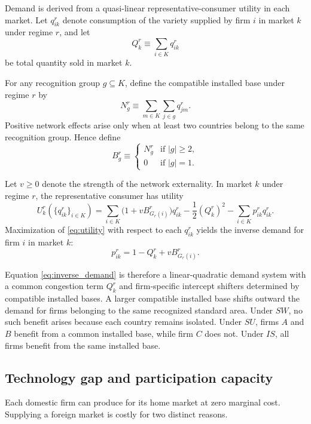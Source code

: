 Demand is derived from a quasi-linear representative-consumer utility in each market. Let $q_{ik}^r$ denote consumption of the variety supplied by firm $i$ in market $k$ under regime $r$, and let
\[
Q_k^r \equiv \sum_{i \in K} q_{ik}^r
\]
be total quantity sold in market $k$.

For any recognition group $g \subseteq K$, define the compatible installed base under regime $r$ by
\[
N_g^r \equiv \sum_{m \in K} \sum_{j \in g} q_{jm}^r.
\]
Positive network effects arise only when at least two countries belong to the same recognition group. Hence define
\[
B_g^r \equiv 
\begin{cases}
N_g^r & \text{if } |g| \ge 2,\\
0   & \text{if } |g| = 1.
\end{cases}
\]

Let $v \ge 0$ denote the strength of the network externality. In market $k$ under regime $r$, the representative consumer has utility
\begin{equation}
U_k^r(\{q_{ik}^r\}_{i \in K})
=
\sum_{i \in K} \bigl(1 + v B_{G_r(i)}^r\bigr) q_{ik}^r
-
\frac{1}{2}(Q_k^r)^2
-
\sum_{i \in K} p_{ik}^r q_{ik}^r.
\label{eq:utility}
\end{equation}
Maximization of \eqref{eq:utility} with respect to each $q_{ik}^r$ yields the inverse demand for firm $i$ in market $k$:
\begin{equation}
p_{ik}^r = 1 - Q_k^r + v B_{G_r(i)}^r.
\label{eq:inverse_demand}
\end{equation}

Equation \eqref{eq:inverse_demand} is therefore a linear-quadratic demand
system with a common congestion term $Q_k^r$ and firm-specific intercept
shifters determined by compatible installed bases. A larger compatible
installed base shifts outward the demand for firms belonging to the same
recognized standard area. Under $SW$, no such benefit arises because each
country remains isolated. Under $SU$, firms $A$ and $B$ benefit from a common
installed base, while firm $C$ does not. Under $IS$, all firms benefit from the
same installed base.

\subsection{Technology gap and participation capacity}

Each domestic firm can produce for its home market at zero marginal cost. Supplying a foreign market is costly for two distinct reasons.

